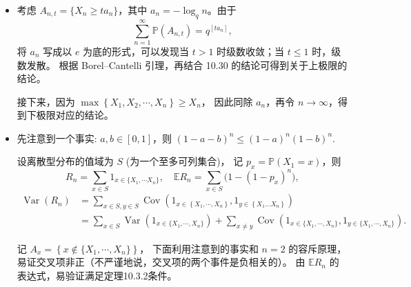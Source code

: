 \begin{itemize}
    于是
    \[\mathbb{P}(N_{n}=k)=\binom{n}{k} \frac{1}{n(n-1) \cdots(n-k+1)} \sum_{i=0}^{n-k} \frac{(-1)^{i}}{i!},\]
    令 $n \rightarrow \infty$，
    $\mathbb{P}(N_{n}=k) \rightarrow \frac{e^{-1}}{k!}$，从而得证！


    \item[10.31]
考虑  $A_{n,t}=\{X_{n} \geq t a_{n}\}$，其中  $a_{n}=-\log_{q} n$。由于
\[\sum_{n=1}^{\infty} \mathbb{P}(A_{n, t})=q^{\left[t a_{n}\right]},\]
将 $a_{n}$ 写成以 $e$ 为底的形式，可以发现当 $t>1$ 时级数收敛；当  $t \leq 1 $ 时，级数发散。
根据 Borel--Cantelli 引理，再结合 10.30 的结论可得到关于上极限的结论。

接下来，因为 $\max \left\{X_{1}, X_{2}, \cdots, X_{n}\right\} \geq X_{n}$，
因此同除 $a_{n}$，再令 $n \rightarrow \infty$，得到下极限对应的结论。

    \item[10.40]
   
先注意到一个事实: $a,b \in [0,1]$，则 $(1-a-b)^{n} \leq (1-a)^{n}(1-b)^{n}$.

设离散型分布的值域为 $S$ (为一个至多可列集合)，
记 $p_{x}=\mathbb{P}(X_{1}=x)$，则
\[R_{n}=\sum_{x \in S} 1_{x \in\{X_{1}, \cdots X_{n}\}},\quad
\mathbb{E} R_{n}=\sum_{x \in S}\big(1-(1-p_{x})^{n}\big),\]
\begin{align*}
\operatorname{Var}(R_{n})&=\sum_{x \in S, y \in S} \operatorname{Cov}\left(1_{x \in\left\{X_{1}, \cdots, X_{n}\right\}}, 1_{y \in\left\{X_{1} \ldots X_{n}\right\}}\right) \\
&=\sum_{x \in S} \operatorname{Var}\left(1_{x \in \{X_{1}, \cdots, X_{n}\}}\right)
+\sum_{x \neq y} \operatorname{Cov}\left(1_{x \in \{X_{1}, \cdots, X_{n}\}}, 1_{y \in \{X_{1}, \cdots, X_{n}\}}\right).
\end{align*}


记 $A_{x}=\left\{x \notin \{X_{1}, \cdots, X_{n}\}\right\}$，
下面利用注意到的事实和 $n=2$ 的容斥原理，易证交叉项非正（不严谨地说，交叉项的两个事件是负相关的）。
由  $\mathbb{E} R_{n}$ 的表达式，易验证满足定理10.3.2条件。
\end{itemize}